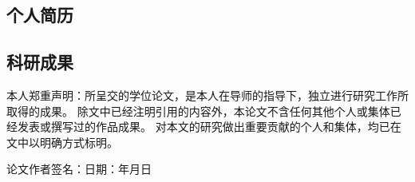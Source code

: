 \documentclass[UTF8, ugly, nopkufont]{pkuthss}
\newif\ifblind\blindfalse
\begin{document}

\printbibliography[heading = bibintoc, title = {参考文献}]

% 

\backmatter


\subsection*{个人简历}

\subsection*{科研成果}

\ifblind\else
{}
\fi

{\songti
  本人郑重声明：所呈交的学位论文，是本人在导师的指导下，独立进行研究工作所取得的成果。
  除文中已经注明引用的内容外，本论文不含任何其他个人或集体已经发表或撰写过的作品成果。
  对本文的研究做出重要贡献的个人和集体，均已在文中以明确方式标明。

  \vspace{2cm}
  论文作者签名：\hspace{4cm}日期：\hspace{1cm}年\hspace{0.8cm}月\hspace{0.8cm}日
}
\end{document}
